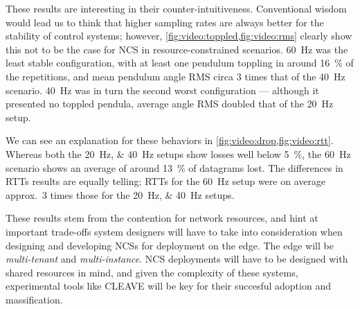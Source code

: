 These results are interesting in their counter-intuitiveness.
Conventional wisdom would lead us to think that higher sampling rates are always better for the stability of control systems; however, \cref{fig:video:toppled,fig:video:rms} clearly show this not to be the case for \ac{NCS} in resource-constrained scenarios.
\SI{60}{\hertz} was the least stable configuration, with at least one pendulum toppling in around \SI{16}{\percent} of the repetitions, and mean pendulum angle \ac{RMS} circa \num{3} times that of the \SI{40}{\hertz} scenario.
\SI{40}{\hertz} was in turn the second worst configuration --- although it presented no toppled pendula, average angle \ac{RMS} doubled that of the \SI{20}{\hertz} setup.

We can see an explanation for these behaviors in \cref{fig:video:drop,fig:video:rtt}.
Whereas both the \SIlist{20;40}{\hertz} setups show losses well below \SI{5}{\percent}, the \SI{60}{\hertz} scenario shows an average of around \SI{13}{\percent} of datagrams lost.
The differences in \acp{RTT} results are equally telling; \acp{RTT} for the \SI{60}{\hertz} setup were on average approx.\ \num{3} times those for the \SIlist{20;40}{\hertz} setups.

These results stem from the contention for network resources, and hint at important trade-offs system designers will have to take into consideration when designing and developing \acp{NCS} for deployment on the edge.
The edge will be \emph{multi-tenant} and \emph{multi-instance}. 
\ac{NCS} deployments will have to be designed with shared resources in mind, and given the complexity of these systems, experimental tools like \ac{CLEAVE} will be key for their succesful adoption and massification.
